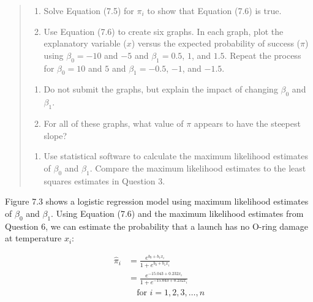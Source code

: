 \documentclass[
]{report}
\providecommand{\tightlist}{%
  \setlength{\itemsep}{0pt}\setlength{\parskip}{0pt}}
\begin{document}
\begin{quote}
\begin{enumerate}
\def\labelenumi{\arabic{enumi}.}
\setcounter{enumi}{3}
\tightlist
\item
  Solve Equation (7.5) for \(\pi_i\) to show that Equation (7.6) is true.\\
\item
  Use Equation (7.6) to create six graphs. In each graph, plot the explanatory variable (\(x\)) versus the expected probability of success (\(\pi\)) using \(\beta_0 = -10\) and \(-5\) and \(\beta_1 = 0.5\), \(1\), and \(1.5\). Repeat the process for \(\beta_0 = 10\) and \(5\) and \(\beta_1 = -0.5\), \(-1\), and \(-1.5\).\\
\end{enumerate}

\begin{enumerate}
\def\labelenumi{\alph{enumi}.}
\tightlist
\item
  Do not submit the graphs, but explain the impact of changing \(\beta_0\) and \(\beta_1\).\\
\item
  For all of these graphs, what value of \(\pi\) appears to have the steepest slope?\\
\end{enumerate}

\begin{enumerate}
\def\labelenumi{\arabic{enumi}.}
\setcounter{enumi}{5}
\tightlist
\item
  Use statistical software to calculate the maximum likelihood estimates of \(\beta_0\) and \(\beta_1\). Compare the maximum likelihood estimates to the least squares estimates in Question 3.
\end{enumerate}
\end{quote}

Figure 7.3 shows a logistic regression model using maximum likelihood estimates of \(\beta_0\) and \(\beta_1\). Using Equation (7.6) and the maximum likelihood estimates from Question 6, we can estimate the probability that a launch has no O-ring damage at temperature \(x_i\):

\begin{align}
\hat\pi_i 
&= \frac{e^{b_0 + b_1 x_i}}{1 + e^{b_0 + b_1 x_i}} \\
&= \frac{e^{-15.043 + 0.232 x_i}}{1 + e^{-15.043 + 0.232 x_i}} \\
&\quad \text{for } i = 1,2,3,\dots,n \tag{7.9}
\end{align}
\end{document}
